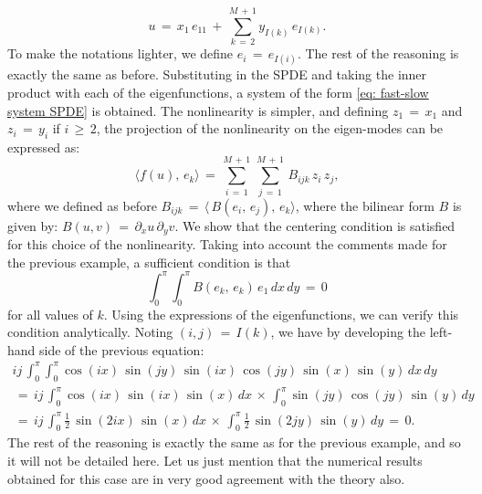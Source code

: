 \begin{equation*}
    u \,=\, x_1\,e_{11} \,+\, \sum_{ k\,=\,2}^{ M\,+\,1} y_{I(k)} \, e_{I(k)}.
\end{equation*}
To make the notations lighter, we define $e_i \,=\, e_{I(i)}$. The rest of the reasoning is exactly the same as before. Substituting in the SPDE and taking the inner product with each of the eigenfunctions, a system of the form \eqref{eq: fast-slow system SPDE} is obtained. The nonlinearity is simpler, and defining $z_1 \,=\, x_1$ and $z_i \,=\,y_i$ if $i \,{\geq}\,2$, the projection of the nonlinearity on the eigen-modes can be expressed as:
\begin{equation}
    \langle f(u),\,e_k\rangle \,=\,\sum_{ i\,=\,1}^{ M\,+\,1}\, \sum_{ j\,=\,1}^{ M\,+\,1}\,B_{ijk}\,z_i\,z_j, 
    \label{eq: projection nonlin example}
\end{equation}
where we defined as before $B_{ijk} \,=\, \langle\, B(e_i,\,e_j),\,e_k \rangle$, where the bilinear form $B$ is given by: $B(u,v) \,=\, {\partial}_x u \, {\partial}_y v$. We show that the centering condition is satisfied for this choice of the nonlinearity. Taking into account the comments made for the previous example, a sufficient condition is that
$$
\int_{ 0}^{ {\pi}}\int_{ 0}^{ {\pi}} B(e_k,\,e_k) \, e_1 \, dx\, dy \,=\,0
$$
for all values of $k$. Using the expressions of the eigenfunctions, we can verify this condition analytically. Noting $(i,j) \,=\,I(k)$, we have by developing the left-hand side of the previous equation:
\begin{multline*}
    ij\,\int_{ 0}^{ {\pi}} \int_{ 0}^{ {\pi}} \cos(ix)\,\sin(jy)\,\sin(ix)\,\cos(jy)\,\sin(x)\,\sin(y)\, dx\, dy \\\,=\, ij\,\int_0^{\pi}\cos(ix)\,\sin(ix)\, \sin(x) \, dx \,{\times}\, \int_{ 0}^{ {\pi}} \sin(jy)\, \cos(jy)\, \sin(y)\,dy \\ \,=\, ij\,\int_{ 0}^{ {\pi}} \frac{1}{2}\,\sin(2ix)\,\sin(x) \, dx \,{\times}\,\int_{ 0}^{ {\pi}} \frac{1}{2}\,\sin(2jy)\,\sin(y)\,dy\,=\,0.
\end{multline*}
The rest of the reasoning is exactly the same as for the previous example, and
so it will not be detailed here. Let us just mention that the numerical results
obtained for this case are in very good agreement with the theory also.

